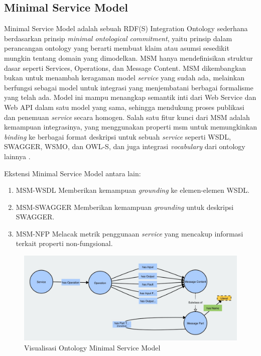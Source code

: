 \subsection{Minimal Service Model}
\label{subsec:minimal-service-model}

Minimal Service Model adalah sebuah RDF(S) Integration Ontology sederhana berdasarkan prinsip \textit{minimal ontological commitment}, yaitu prinsip dalam perancangan ontology yang berarti membuat klaim atau asumsi sesedikit mungkin tentang domain yang dimodelkan. MSM hanya mendefinisikan struktur dasar seperti Services, Operations, dan Message Content. MSM dikembangkan bukan untuk menambah keragaman model \textit{service} yang sudah ada, melainkan berfungsi sebagai model untuk integrasi yang menjembatani berbagai formalisme yang telah ada. Model ini mampu menangkap semantik inti dari Web Service dan Web API dalam satu model yang sama, sehingga mendukung proses publikasi dan penemuan \textit{service} secara homogen. Salah satu fitur kunci dari MSM adalah kemampuan integrasinya, yang menggunakan properti msm untuk memungkinkan \textit{binding} ke berbagai format deskripsi untuk sebuah \textit{service} seperti WSDL, SWAGGER, WSMO, dan OWL-S, dan juga integrasi \textit{vocabulary} dari ontology lainnya \parencite{iserve2015datamodel}.

Ekstensi Minimal Service Model antara lain:
\begin{enumerate}
  \item MSM-WSDL \break Memberikan kemampuan \textit{grounding} ke elemen-elemen WSDL.
  \item MSM-SWAGGER \break Memberikan kemampuan \textit{grounding} untuk deskripsi SWAGGER.
  \item MSM-NFP \break Melacak metrik penggunaan \textit{service} yang mencakup informasi terkait properti non-fungsional.
\end{enumerate}

\begin{figure}[ht]
  \centering
  \includegraphics[width=1\textwidth]{resources/chapter-2/msm-visualization.jpg}
  \caption{Visualisasi Ontology Minimal Service Model \parencite{third2017linked}}
  \label{image:msm-visualization}
\end{figure}